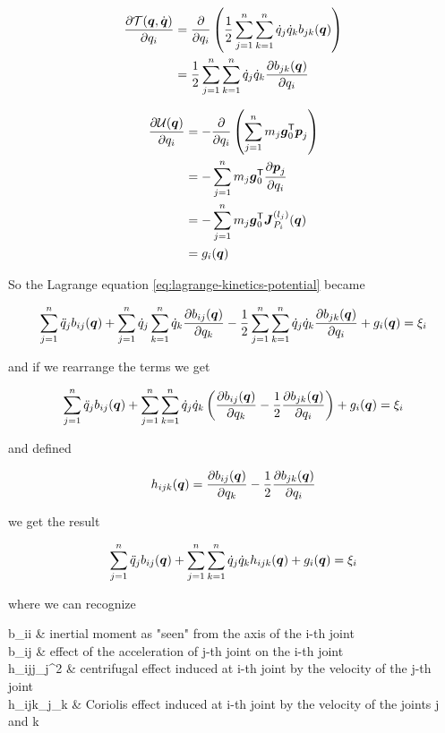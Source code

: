 \begin{align*}
	\frac{\partial \mathcal{T}(\boldsymbol{q},\dot{\boldsymbol{q}})}{\partial q_i}
	&= \frac{\partial}{\partial q_i} \left( \frac{1}{2} \sum_{j=1}^n \sum_{k=1}^n \dot{q}_j \dot{q}_k b_{jk}(\boldsymbol{q}) \right) \\
	&= \frac{1}{2} \sum_{j=1}^n \sum_{k=1}^n \dot{q}_j \dot{q}_k \frac{\partial b_{jk}(\boldsymbol{q})}{\partial q_i}
\end{align*}

\begin{align*}
	\frac{\partial \mathcal{U}(\boldsymbol{q})}{\partial q_i}
	&= - \frac{\partial}{\partial q_i} \left(\sum_{j=1}^n m_j \boldsymbol{g}_0^{\mathsf{T}} \boldsymbol{p}_j \right) \\
	&= - \sum_{j=1}^n m_j \boldsymbol{g}_0^{\mathsf{T}} \frac{\partial \boldsymbol{p}_j}{\partial q_i} \\
	&= - \sum_{j=1}^n m_j \boldsymbol{g}_0^{\mathsf{T}} \boldsymbol{J}_{P_i}^{(l_j)}(\boldsymbol{q}) \\
	&= g_i(\boldsymbol{q})
\end{align*}

So the Lagrange equation \ref{eq:lagrange-kinetics-potential} became

\[
	\sum_{j=1}^n \ddot{q}_j b_{ij}(\boldsymbol{q}) + \sum_{j=1}^n \dot{q}_j \sum_{k=1}^n \dot{q}_k \frac{\partial b_{ij}(\boldsymbol{q})}{\partial q_k}
	- \frac{1}{2} \sum_{j=1}^n \sum_{k=1}^n \dot{q}_j \dot{q}_k \frac{\partial b_{jk}(\boldsymbol{q})}{\partial q_i} + g_i(\boldsymbol{q}) = \xi_i
\]

and if we rearrange the terms we get

\[
	\sum_{j=1}^n \ddot{q}_j b_{ij}(\boldsymbol{q}) + \sum_{j=1}^n \sum_{k=1}^n \dot{q}_j \dot{q}_k \left( \frac{\partial b_{ij}(\boldsymbol{q})}{\partial q_k} - \frac{1}{2} \frac{\partial b_{jk}(\boldsymbol{q})}{\partial q_i} \right) + g_i(\boldsymbol{q}) = \xi_i
\]

and defined

\[ h_{ijk}(\boldsymbol{q}) = \frac{\partial b_{ij}(\boldsymbol{q})}{\partial q_k} - \frac{1}{2} \frac{\partial b_{jk}(\boldsymbol{q})}{\partial q_i} \]

we get the result

\[
	\sum_{j=1}^n \ddot{q}_j b_{ij}(\boldsymbol{q}) + \sum_{j=1}^n \sum_{k=1}^n \dot{q}_j \dot{q}_k h_{ijk}(\boldsymbol{q}) + g_i(\boldsymbol{q}) = \xi_i
\]

where we can recognize

\begin{conditions}
	b_{ii} & inertial moment as "seen" from the axis of the i-th joint \\
	b_{ij} & effect of the acceleration of j-th joint on the i-th joint \\
	h_{ijj}_j^2 & centrifugal effect induced at i-th joint by the velocity of the j-th joint \\
	h_{ijk}_j_k & Coriolis effect induced at i-th joint by the velocity of the joints j and k
\end{conditions}

